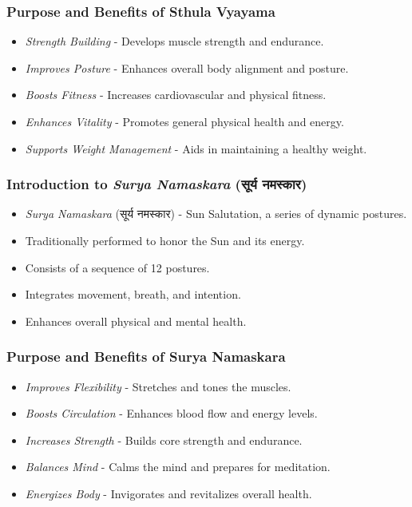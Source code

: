 \begin{frame}[fragile]\frametitle{Purpose and Benefits of Sthula Vyayama}

      \begin{itemize}
		\item \textit{Strength Building} - Develops muscle strength and endurance.
		\item \textit{Improves Posture} - Enhances overall body alignment and posture.
		\item \textit{Boosts Fitness} - Increases cardiovascular and physical fitness.
		\item \textit{Enhances Vitality} - Promotes general physical health and energy.
		\item \textit{Supports Weight Management} - Aids in maintaining a healthy weight.
	  \end{itemize}

\end{frame}

\begin{frame}[fragile]\frametitle{Introduction to \textit{Surya Namaskara} (सूर्य नमस्कार)}

      \begin{itemize}
        \item \textit{Surya Namaskara} (सूर्य नमस्कार) - Sun Salutation, a series of dynamic postures.
        \item Traditionally performed to honor the Sun and its energy.
        \item Consists of a sequence of 12 postures.
        \item Integrates movement, breath, and intention.
        \item Enhances overall physical and mental health.
      \end{itemize}

\end{frame}


\begin{frame}[fragile]\frametitle{Purpose and Benefits of Surya Namaskara}

      \begin{itemize}
		\item \textit{Improves Flexibility} - Stretches and tones the muscles.
		\item \textit{Boosts Circulation} - Enhances blood flow and energy levels.
		\item \textit{Increases Strength} - Builds core strength and endurance.
		\item \textit{Balances Mind} - Calms the mind and prepares for meditation.
		\item \textit{Energizes Body} - Invigorates and revitalizes overall health.
	  \end{itemize}

\end{frame}


